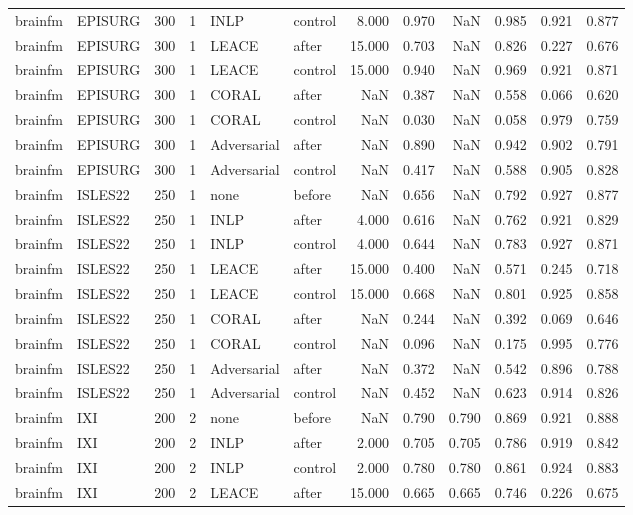 \begin{tabular}{llrrllrrrrrr}
brainfm & EPISURG & 300 & 1 & INLP & control & 8.000 & 0.970 & NaN & 0.985 & 0.921 & 0.877 \\
brainfm & EPISURG & 300 & 1 & LEACE & after & 15.000 & 0.703 & NaN & 0.826 & 0.227 & 0.676 \\
brainfm & EPISURG & 300 & 1 & LEACE & control & 15.000 & 0.940 & NaN & 0.969 & 0.921 & 0.871 \\
brainfm & EPISURG & 300 & 1 & CORAL & after & NaN & 0.387 & NaN & 0.558 & 0.066 & 0.620 \\
brainfm & EPISURG & 300 & 1 & CORAL & control & NaN & 0.030 & NaN & 0.058 & 0.979 & 0.759 \\
brainfm & EPISURG & 300 & 1 & Adversarial & after & NaN & 0.890 & NaN & 0.942 & 0.902 & 0.791 \\
brainfm & EPISURG & 300 & 1 & Adversarial & control & NaN & 0.417 & NaN & 0.588 & 0.905 & 0.828 \\
brainfm & ISLES22 & 250 & 1 & none & before & NaN & 0.656 & NaN & 0.792 & 0.927 & 0.877 \\
brainfm & ISLES22 & 250 & 1 & INLP & after & 4.000 & 0.616 & NaN & 0.762 & 0.921 & 0.829 \\
brainfm & ISLES22 & 250 & 1 & INLP & control & 4.000 & 0.644 & NaN & 0.783 & 0.927 & 0.871 \\
brainfm & ISLES22 & 250 & 1 & LEACE & after & 15.000 & 0.400 & NaN & 0.571 & 0.245 & 0.718 \\
brainfm & ISLES22 & 250 & 1 & LEACE & control & 15.000 & 0.668 & NaN & 0.801 & 0.925 & 0.858 \\
brainfm & ISLES22 & 250 & 1 & CORAL & after & NaN & 0.244 & NaN & 0.392 & 0.069 & 0.646 \\
brainfm & ISLES22 & 250 & 1 & CORAL & control & NaN & 0.096 & NaN & 0.175 & 0.995 & 0.776 \\
brainfm & ISLES22 & 250 & 1 & Adversarial & after & NaN & 0.372 & NaN & 0.542 & 0.896 & 0.788 \\
brainfm & ISLES22 & 250 & 1 & Adversarial & control & NaN & 0.452 & NaN & 0.623 & 0.914 & 0.826 \\
brainfm & IXI & 200 & 2 & none & before & NaN & 0.790 & 0.790 & 0.869 & 0.921 & 0.888 \\
brainfm & IXI & 200 & 2 & INLP & after & 2.000 & 0.705 & 0.705 & 0.786 & 0.919 & 0.842 \\
brainfm & IXI & 200 & 2 & INLP & control & 2.000 & 0.780 & 0.780 & 0.861 & 0.924 & 0.883 \\
brainfm & IXI & 200 & 2 & LEACE & after & 15.000 & 0.665 & 0.665 & 0.746 & 0.226 & 0.675 \\

\end{tabular}
